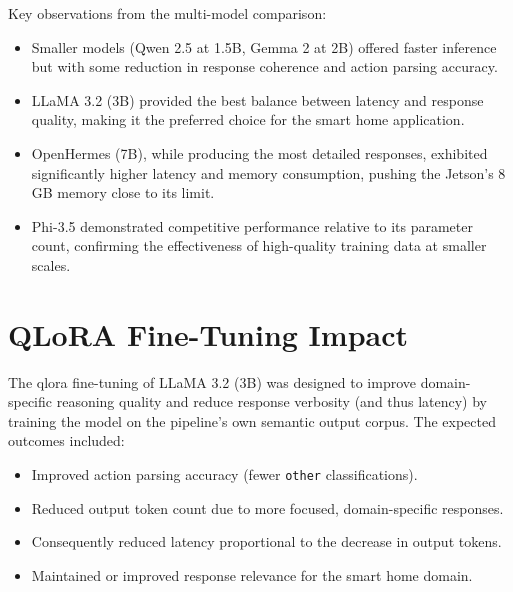 \documentclass[12pt,a4paper,oneside]{report}
\begin{document}

Key observations from the multi-model comparison:

\begin{itemize}
    \item Smaller models (Qwen 2.5 at 1.5B, Gemma 2 at 2B) offered faster inference but with some reduction in response coherence and action parsing accuracy.
    \item LLaMA 3.2 (3B) provided the best balance between latency and response quality, making it the preferred choice for the smart home application.
    \item OpenHermes (7B), while producing the most detailed responses, exhibited significantly higher latency and memory consumption, pushing the Jetson's 8\,GB memory close to its limit.
    \item Phi-3.5 demonstrated competitive performance relative to its parameter count, confirming the effectiveness of high-quality training data at smaller scales.
\end{itemize}


\section{QLoRA Fine-Tuning Impact}
\label{sec:res-qlora}


The \gls{qlora} fine-tuning of LLaMA 3.2 (3B) was designed to improve domain-specific reasoning quality and reduce response verbosity (and thus latency) by training the model on the pipeline's own semantic output corpus. The expected outcomes included:

\begin{itemize}
    \item Improved action parsing accuracy (fewer \texttt{other} classifications).
    \item Reduced output token count due to more focused, domain-specific responses.
    \item Consequently reduced latency proportional to the decrease in output tokens.
    \item Maintained or improved response relevance for the smart home domain.
\end{itemize}

\end{document}
